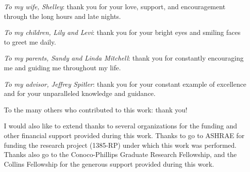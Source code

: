  \noindent\textit{To my wife, Shelley}: thank you for your love, support, and encouragement through the long hours and late nights.

 \noindent\textit{To my children, Lily and Levi}:  thank you for your bright eyes and smiling faces to greet me daily.

\noindent\textit{To my parents, Sandy and Linda Mitchell}: thank you for constantly encouraging me and guiding me throughout my life.
  
\noindent\textit{To my advisor, Jeffrey Spitler}: thank you for your constant example of excellence and for your unparalleled knowledge and guidance.

\noindent To the many others who contributed to this work: thank you!

\noindent I would also like to extend thanks to several organizations for the funding and other financial support provided during this work. Thanks to go to ASHRAE for funding the research project (1385-RP) under which this work was performed. Thanks also go to the Conoco-Phillips Graduate Research Fellowship, and the Collins Fellowship for the generous support provided during this work.
